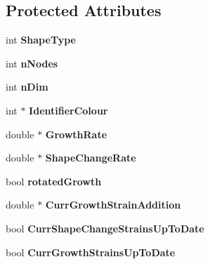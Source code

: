 \subsection*{Protected Attributes}
\begin{DoxyCompactItemize}
\item 
\hypertarget{classShapeBase_a36aedd41e8465a186a0b0c454b5b76f3}{}int {\bfseries Shape\+Type}\label{classShapeBase_a36aedd41e8465a186a0b0c454b5b76f3}

\item 
\hypertarget{classShapeBase_ae7dd93b58b3281ce90025f83d0f0e976}{}int {\bfseries n\+Nodes}\label{classShapeBase_ae7dd93b58b3281ce90025f83d0f0e976}

\item 
\hypertarget{classShapeBase_a250bd3396546342c8104f5b9c180d18f}{}int {\bfseries n\+Dim}\label{classShapeBase_a250bd3396546342c8104f5b9c180d18f}

\item 
\hypertarget{classShapeBase_a02035767d6d169d4a2c1db5f6af8a218}{}int $\ast$ {\bfseries Identifier\+Colour}\label{classShapeBase_a02035767d6d169d4a2c1db5f6af8a218}

\item 
\hypertarget{classShapeBase_ae31d7545110fd505629592348a2951b7}{}double $\ast$ {\bfseries Growth\+Rate}\label{classShapeBase_ae31d7545110fd505629592348a2951b7}

\item 
\hypertarget{classShapeBase_a1c6db43b0794a15e4bc42b8ca994a785}{}double $\ast$ {\bfseries Shape\+Change\+Rate}\label{classShapeBase_a1c6db43b0794a15e4bc42b8ca994a785}

\item 
\hypertarget{classShapeBase_aee6a2cd267d49404f5442a48c867860f}{}bool {\bfseries rotated\+Growth}\label{classShapeBase_aee6a2cd267d49404f5442a48c867860f}

\item 
\hypertarget{classShapeBase_ad5b59419d3e5c4d61a14bad64f053e69}{}double $\ast$ {\bfseries Curr\+Growth\+Strain\+Addition}\label{classShapeBase_ad5b59419d3e5c4d61a14bad64f053e69}

\item 
\hypertarget{classShapeBase_a8bb52a406f331e6938694a4902bafb20}{}bool {\bfseries Curr\+Shape\+Change\+Strains\+Up\+To\+Date}\label{classShapeBase_a8bb52a406f331e6938694a4902bafb20}

\item 
\hypertarget{classShapeBase_a526231dcaa8d4a871e198284b4c4d9ff}{}bool {\bfseries Curr\+Growth\+Strains\+Up\+To\+Date}\label{classShapeBase_a526231dcaa8d4a871e198284b4c4d9ff}


\end{DoxyCompactItemize}
